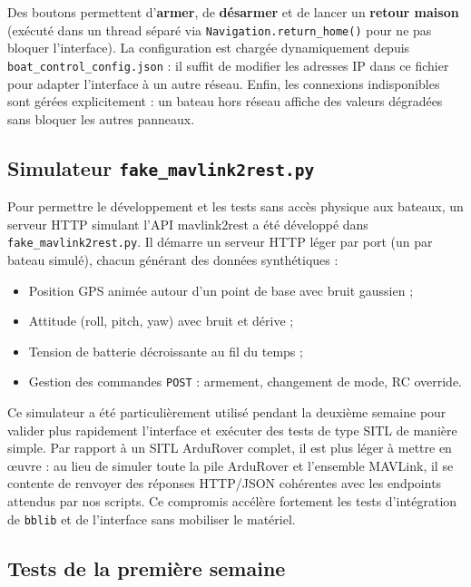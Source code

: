 Des boutons permettent d'\textbf{armer}, de \textbf{désarmer} et de lancer un \textbf{retour maison} (exécuté dans un thread séparé via \texttt{Navigation.return\_home()} pour ne pas bloquer l'interface). La configuration est chargée dynamiquement depuis \texttt{boat\_control\_config.json} : il suffit de modifier les adresses IP dans ce fichier pour adapter l'interface à un autre réseau. Enfin, les connexions indisponibles sont gérées explicitement : un bateau hors réseau affiche des valeurs dégradées sans bloquer les autres panneaux.

\subsection{Simulateur \texttt{fake\_mavlink2rest.py}}
\label{sec:bblib:fake}

Pour permettre le développement et les tests sans accès physique aux bateaux, un serveur HTTP simulant l'API mavlink2rest a été développé dans \texttt{fake\_mavlink2rest.py}. Il démarre un serveur HTTP léger par port (un par bateau simulé), chacun générant des données synthétiques :
\begin{itemize}
  \item Position GPS animée autour d'un point de base avec bruit gaussien ;
  \item Attitude (roll, pitch, yaw) avec bruit et dérive ;
  \item Tension de batterie décroissante au fil du temps ;
  \item Gestion des commandes \texttt{POST} : armement, changement de mode, RC override.
\end{itemize}

Ce simulateur a été particulièrement utilisé pendant la deuxième semaine pour valider plus rapidement l'interface et exécuter des tests de type SITL de manière simple. Par rapport à un SITL ArduRover complet, il est plus léger à mettre en œuvre : au lieu de simuler toute la pile ArduRover et l'ensemble MAVLink, il se contente de renvoyer des réponses HTTP/JSON cohérentes avec les endpoints attendus par nos scripts. Ce compromis accélère fortement les tests d'intégration de \texttt{bblib} et de l'interface sans mobiliser le matériel.

\subsection{Tests de la première semaine}
\label{sec:bblib:tests}

